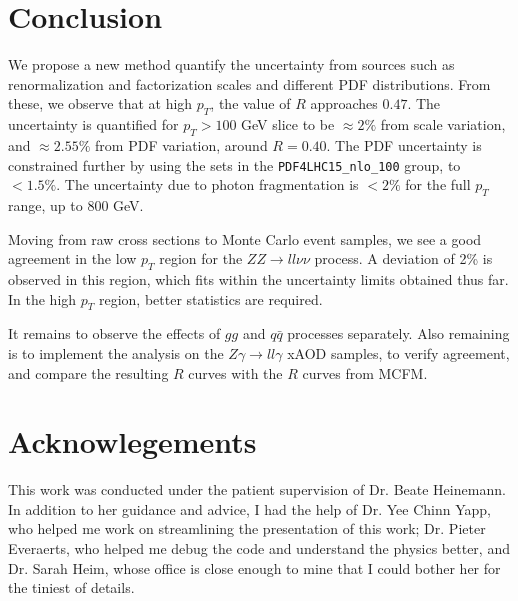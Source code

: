 \documentclass[11pt,a4paper,final]{report}
\newcommand{\ZZ}{$ZZ\rightarrow ll\nu\nu$ }
\newcommand{\Zgam}{$Z\gamma\rightarrow ll\gamma$ }
\begin{document}
\section{Conclusion}
We propose a new method quantify the uncertainty from sources such as renormalization and factorization scales and different PDF distributions. From these, we observe that at high $p_T$, the value of $R$ approaches $0.47$. The uncertainty is quantified for $p_T > 100$ GeV slice to be $\approx 2\%$ from scale variation, and $\approx 2.55\%$ from PDF variation, around $R = 0.40$. The PDF uncertainty is constrained further by using the sets in the \texttt{PDF4LHC15\_nlo\_100} group, to $<1.5\%$. The uncertainty due to photon fragmentation is $<2\%$ for the full $p_T$ range, up to 800 GeV.

Moving from raw cross sections to Monte Carlo event samples, we see a good agreement in the low $p_T$ region for the \ZZ process. A deviation of 2\% is observed in this region, which fits within the uncertainty limits obtained thus far. In the high $p_T$ region, better statistics are required.

It remains to observe the effects of $gg$ and $q\bar{q}$ processes separately. Also remaining is to implement the analysis on the \Zgam xAOD samples, to verify agreement, and compare the resulting $R$ curves with the $R$ curves from MCFM.

\section*{Acknowlegements}
This work was conducted under the patient supervision of Dr. Beate Heinemann. In addition to her guidance and advice, I had the help of Dr. Yee Chinn Yapp, who helped me work on streamlining the presentation of this work; Dr. Pieter Everaerts, who helped me debug the code and understand the physics better, and Dr. Sarah Heim, whose office is close enough to mine that I could bother her for the tiniest of details.
\end{document}
